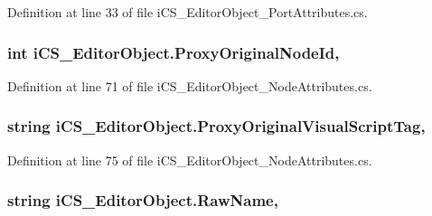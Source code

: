 Definition at line 33 of file i\+C\+S\+\_\+\+Editor\+Object\+\_\+\+Port\+Attributes.\+cs.

\hypertarget{classi_c_s___editor_object_a2b1d129fb783ec3efe889f720627aa2f}{
\subsubsection[{Proxy\+Original\+Node\+Id}]{\setlength{\rightskip}{0pt plus 5cm}int i\+C\+S\+\_\+\+Editor\+Object.\+Proxy\+Original\+Node\+Id\hspace{0.3cm}{\ttfamily [get]}, {\ttfamily [set]}}}\label{classi_c_s___editor_object_a2b1d129fb783ec3efe889f720627aa2f}


Definition at line 71 of file i\+C\+S\+\_\+\+Editor\+Object\+\_\+\+Node\+Attributes.\+cs.

\hypertarget{classi_c_s___editor_object_afe44795d37172ff28b6a05f94f2130b6}{
\subsubsection[{Proxy\+Original\+Visual\+Script\+Tag}]{\setlength{\rightskip}{0pt plus 5cm}string i\+C\+S\+\_\+\+Editor\+Object.\+Proxy\+Original\+Visual\+Script\+Tag\hspace{0.3cm}{\ttfamily [get]}, {\ttfamily [set]}}}\label{classi_c_s___editor_object_afe44795d37172ff28b6a05f94f2130b6}


Definition at line 75 of file i\+C\+S\+\_\+\+Editor\+Object\+\_\+\+Node\+Attributes.\+cs.

\hypertarget{classi_c_s___editor_object_a55e83715a61b25c738fc914cfdcb4966}{
\subsubsection[{Raw\+Name}]{\setlength{\rightskip}{0pt plus 5cm}string i\+C\+S\+\_\+\+Editor\+Object.\+Raw\+Name\hspace{0.3cm}{\ttfamily [get]}, {\ttfamily [set]}}}\label{classi_c_s___editor_object_a55e83715a61b25c738fc914cfdcb4966}


